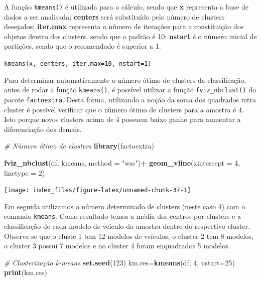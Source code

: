 \documentclass[12pt,brazil,oneside]{book}
\newenvironment{Shaded}{\begin{snugshade}}{\end{snugshade}}
\newcommand{\CommentTok}[1]{\textcolor[rgb]{0.56,0.35,0.01}{\textit{#1}}}
\newcommand{\DataTypeTok}[1]{\textcolor[rgb]{0.13,0.29,0.53}{#1}}
\newcommand{\DecValTok}[1]{\textcolor[rgb]{0.00,0.00,0.81}{#1}}
\newcommand{\KeywordTok}[1]{\textcolor[rgb]{0.13,0.29,0.53}{\textbf{#1}}}
\newcommand{\NormalTok}[1]{#1}
\newcommand{\OperatorTok}[1]{\textcolor[rgb]{0.81,0.36,0.00}{\textbf{#1}}}
\newcommand{\StringTok}[1]{\textcolor[rgb]{0.31,0.60,0.02}{#1}}
\begin{document}
A função \texttt{kmeans()} é utilizada para o cálculo, sendo que \textbf{x} representa a base de dados a ser analisada; \textbf{centers} será substituído pelo número de clusters desejados; \textbf{iter.max} representa o número de iterações para a constituição dos objetos dentro dos clusters, sendo que o padrão é 10; \textbf{nstart} é o número inicial de partições, sendo que o recomendado é superior a 1.

\texttt{kmeans(x,\ centers,\ iter.max=10,\ nstart=1)}

Para determinar automaticamente o número ótimo de clusters da classificação, antes de rodar a função \texttt{kmeans()}, é possível utilizar a função \texttt{fviz\_nbclust()} do pacote \texttt{factoextra}. Desta forma, utilizando a noção da soma dos quadrados intra cluster é possível verificar que o número ótimo de clusters para a amostra é 4. Isto porque novos clusters acima de 4 possuem baixo ganho para aumentar a diferenciação dos demais.

\begin{Shaded}
\begin{Highlighting}[]
\CommentTok{# Número ótimo de clusters}
\KeywordTok{library}\NormalTok{(factoextra)}

\KeywordTok{fviz_nbclust}\NormalTok{(df, kmeans, }\DataTypeTok{method =} \StringTok{"wss"}\NormalTok{)}\OperatorTok{+}
\StringTok{  }\KeywordTok{geom_vline}\NormalTok{(}\DataTypeTok{xintercept =} \DecValTok{4}\NormalTok{, }\DataTypeTok{linetype =} \DecValTok{2}\NormalTok{)}
\end{Highlighting}
\end{Shaded}

\begin{center}\texttt{[image: index\_files/figure-latex/unnamed-chunk-37-1]} \end{center}

Em seguida utilizamos o número determinado de clusters (neste caso 4) com o comando \texttt{kmeans}. Como resultado temos a média dos centros por clusters e a classificação de cada modelo de veículo da amostra dentro do respectivo cluster. Observa-se que o cluste 1 tem 12 modelos de veículos, o cluster 2 tem 8 modelos, o cluster 3 possui 7 modelos e no cluster 4 foram enquadrados 5 modelos.

\begin{Shaded}
\begin{Highlighting}[]
\CommentTok{# Clusterização k-means}
\KeywordTok{set.seed}\NormalTok{(}\DecValTok{123}\NormalTok{)}
\NormalTok{km.res=}\KeywordTok{kmeans}\NormalTok{(df, }\DecValTok{4}\NormalTok{, }\DataTypeTok{nstart=}\DecValTok{25}\NormalTok{)}
\KeywordTok{print}\NormalTok{(km.res)}
\end{Highlighting}
\end{Shaded}
\end{document}
